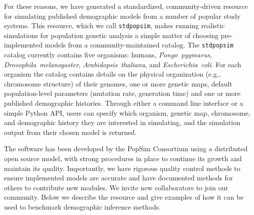 \documentclass[12pt,halfline,a4paper]{ouparticle}
\newcommand{\stdpopsim}{\texttt{stdpopsim}\xspace}
\begin{document}
For these reasons, we have generated a standardized, community-driven resource
for simulating published demographic models from a number of popular study systems.
This resource, which we call \texttt{stdpopsim}, makes running
realistic simulations for population genetic analysis a simple matter of
choosing pre-implemented models from a community-maintained catalog.
The \stdpopsim catalog currently contains five organisms: humans, \emph{Pongo~pygmaeus},
\emph{Drosophila~melanogaster}, \emph{Arabidopsis~thaliana}, and \emph{Escherichia~coli}. For each
organism the catalog contains details on the physical organization (e.g., chromosome structure)
of their genomes, one or more genetic maps, default population-level parameters (mutation rate,
generation time) and one or more published demographic histories. Through
either a command line interface or a simple Python API, users can specify which
organism, genetic map, chromosome, and demographic history they are interested in simulating, and the
simulation output from their chosen model is returned.

The software has been developed by the PopSim Consortium using a
distributed open source model, with strong procedures in place
to continue its growth and maintain its quality.
Importantly, we have rigorous quality control methods to ensure implemented models are accurate
and have documented methods for others to contribute new modules.
We invite new collaborators to join our community.
Below we describe the resource and give
examples of how it can be used to benchmark demographic inference methods.
\end{document}
